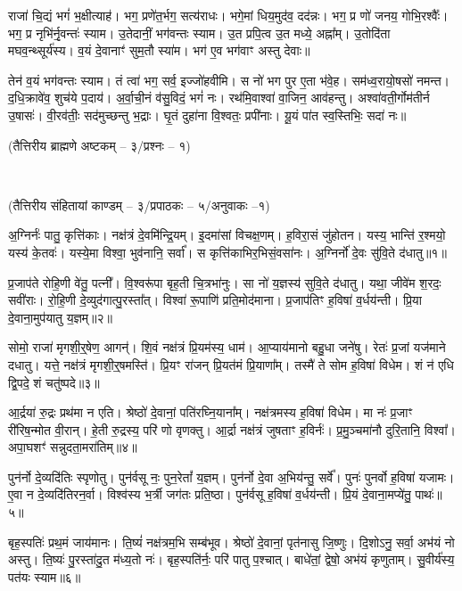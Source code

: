 राजा॑ चि॒द्यं भगं॑ भ॒क्षीत्याह॑।
भग॒ प्रणे॑त॒र्भग॒ सत्य॑राधः।
भगे॒मां धिय॒मुद॑व॒ दद॑न्नः।
भग॒ प्र णो॑ जनय॒ गोभि॒रश्वैः᳚।
भग॒ प्र नृभि॑र्नृ॒वन्तः॑ स्याम।
उ॒तेदानीं॒ भग॑वन्तः स्याम।
उ॒त प्रपि॒त्व उ॒त मध्ये॒ अह्ना᳚म्।
उ॒तोदि॑ता मघव॒न्थ्सूर्य॑स्य।
व॒यं दे॒वानाꣳ॑ सुम॒तौ स्या॑म।
भग॑ ए॒व भग॑वाꣳ अस्तु देवाः॥

तेन॑ व॒यं भग॑वन्तः स्याम।
तं त्वा॑ भग॒ सर्व॒ इज्जो॑हवीमि।
स नो॑ भग पुर ए॒ता भ॑वे॒ह।
सम॑ध्व॒रायो॒षसो॑ नमन्त।
द॒धि॒क्रावे॑व॒ शुच॑ये प॒दाय॑।
अ॒र्वा॒ची॒नं व॑सु॒विदं॒ भगं॑ नः।
रथ॑मि॒वाश्वा॑ वा॒जिन॒ आव॑हन्तु।
अश्वा॑वती॒र्गोम॑तीर्न उ॒षासः॑।
वी॒रव॑तीः॒ सद॑मुच्छन्तु भ॒द्राः।
घृ॒तं दुहा॑ना वि॒श्वतः॒ प्रपी॑नाः।
यू॒यं पा॑त स्व॒स्तिभिः॒ सदा॑ नः॥

\centerline{\scriptsize(तैत्तिरीय ब्राह्मणे अष्टकम् -- ३/प्रश्नः -- १)}\mbox{}\\[-2em]
\centerline{\scriptsize(तैत्तिरीय संहितायां काण्डम् -- ३/प्रपाठकः -- ५/अनुवाकः --१)}

अ॒ग्निर्नः॑ पातु॒ कृत्ति॑काः।
नक्ष॑त्रं दे॒वमि॑न्द्रि॒यम्।
इ॒दमा॑सां विचक्ष॒णम्।
ह॒विरा॒सं जु॑होतन।
यस्य॒ भान्ति॑ र॒श्मयो॒ यस्य॑ के॒तवः॑।
यस्ये॒मा विश्वा॒ भुव॑नानि॒ सर्वा᳚।
स कृत्ति॑काभि\-र॒भिसं॒वसा॑नः।
अ॒ग्निर्नो॑ दे॒वः सु॑वि॒ते द॑धातु॥१॥ 

प्र॒जाप॑ते रोहि॒णी वे॑तु॒ पत्नी᳚।
वि॒श्वरू॑पा बृह॒ती चि॒त्रभा॑नुः।
सा नो॑ य॒ज्ञस्य॑ सुवि॒ते द॑धातु।
यथा॒ जीवे॑म श॒रदः॒ सवी॑राः।
रो॒हि॒णी दे॒व्युद॑गात्पु॒रस्ता᳚त्।
विश्वा॑ रू॒पाणि॑ प्रति॒मोद॑माना।
प्र॒जाप॑तिꣳ ह॒विषा॑ व॒र्धय॑न्ती।
प्रि॒या दे॒वाना॒मुप॑यातु य॒ज्ञम्॥२॥ 

सोमो॒ राजा॑ मृगशी॒र्॒‌षेण॒ आगन्॑।
शि॒वं नक्ष॑त्रं प्रि॒यम॑स्य॒ धाम॑।
आ॒प्याय॑मानो बहु॒धा जने॑षु।
रेतः॑ प्र॒जां यज॑माने दधातु।
यत्ते॒ नक्ष॑त्रं मृगशी॒र्॒‌षमस्ति॑।
प्रि॒यꣳ रा॑जन् प्रि॒यत॑मं प्रि॒याणा᳚म्।
तस्मै॑ ते सोम ह॒विषा॑ विधेम।
शं न॑ एधि द्वि॒पदे॒ शं चतु॑ष्पदे॥३॥ 

आ॒र्द्रया॑ रु॒द्रः प्रथ॑मा न एति।
श्रेष्ठो॑ दे॒वानां॒ पति॑रघ्नि॒याना᳚म्।
नक्ष॑त्रमस्य ह॒विषा॑ विधेम।
मा नः॑ प्र॒जाꣳ री॑रिष॒न्मोत वी॒रान्।
हे॒ती रु॒द्रस्य॒ परि॑ णो वृणक्तु।
आ॒र्द्रा नक्ष॑त्रं जुषताꣳ ह॒विर्नः॑।
प्र॒मु॒ञ्चमा॑नौ दुरि॒तानि॒ विश्वा᳚।
अपा॒घशꣳ॑ सन्नुदता॒मरा॑तिम्॥४॥ 

पुन॑र्नो दे॒व्यदि॑तिः स्पृणोतु।
पुन॑र्वसू नः॒ पुन॒रेतां᳚ य॒ज्ञम्।
पुन॑र्नो दे॒वा अ॒भिय॑न्तु॒ सर्वे᳚।
पुनः॑ पुनर्वो ह॒विषा॑ यजामः।
ए॒वा न दे॒व्यदि॑तिरन॒र्वा।
विश्व॑स्य भ॒र्त्री जग॑तः प्रति॒ष्ठा।
पुन॑र्वसू ह॒विषा॑ व॒र्धय॑न्ती।
प्रि॒यं दे॒वाना॒मप्ये॑तु॒ पाथः॑॥५॥ 

बृह॒स्पतिः॑ प्रथ॒मं जाय॑मानः।
ति॒ष्यं॑ नक्ष॑त्रम॒भि सम्ब॑भूव।
श्रेष्ठो॑ दे॒वानां॒ पृत॑नासु जि॒ष्णुः।
दि॒शोऽनु॒ सर्वा॒ अभ॑यं नो अस्तु।
ति॒ष्यः॑ पु॒रस्ता॑दु॒त म॑ध्य॒तो नः॑।
बृह॒स्पति॑र्नः॒ परि॑ पातु प॒श्चात्।
बाधे॑तां॒ द्वेषो॒ अभ॑यं कृणुताम्।
सु॒वीर्य॑स्य॒ पत॑यः स्याम॥६॥ 

